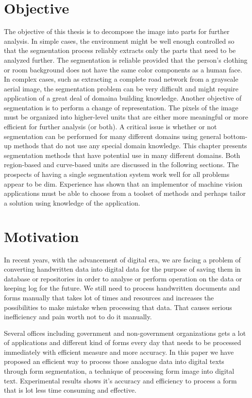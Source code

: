 \section{Objective}
The objective of this thesis is to decompose the image into parts for further analysis. In simple cases, the environment might be well enough controlled so that the segmentation process reliably extracts only the parts that need to be analyzed further. The segmentation is reliable provided that the person's clothing or room background does not have the same color components as a human face. In complex cases, such as extracting a complete road network from a grayscale aerial image, the segmentation problem can be very difficult and might require application of a great deal of domaina building knowledge.
Another objective of segmentation is to perform a change of representation. The pixels of the image must be organized into higher-level units that are either more meaningful or more efficient for further analysis (or both). A critical issue is whether or not segmentation can be performed for many different domains using general bottom-up methods that do not use any special domain knowledge. This chapter presents segmentation methods that have potential use in many different domains. Both region-based and curve-based units are discussed in the following sections. The prospects of having a single segmentation system work well for all problems appear to be dim. Experience has shown that an implementor of machine vision applications must be able to choose from a toolset of methods and perhaps tailor a solution using knowledge of the application.
\section{Motivation}
In recent years, with the advancement of digital era, we are facing a problem of converting handwritten data into digital data for the purpose of saving them in database or repositories in order to analyse or perform operation on the data or keeping log for the future. We still need to process handwritten documents and forms manually that takes lot of times and resources and increases the possibilities to make mistake when processing that data. That causes serious inefficiency and pain worth not to do it manually.

Several offices including government and non-government organizations gets a lot of applications and different kind of forms every day that needs to be processed immediately with efficient measure and more accuracy. 
In this paper we have proposed an efficient way to process those analogue data into digital texts through form segmentation, a technique of processing form image into digital text. Experimental results shows it's accuracy and efficiency to process a form that is lot less time consuming and effective.  

